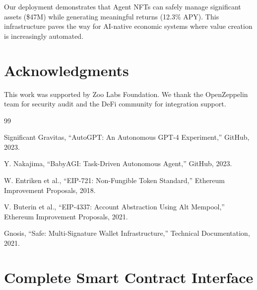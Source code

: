 \documentclass[11pt,letterpaper]{article}
\begin{document}
Our deployment demonstrates that Agent NFTs can safely manage significant assets (\$47M) while generating meaningful returns (12.3\% APY). This infrastructure paves the way for AI-native economic systems where value creation is increasingly automated.

\section*{Acknowledgments}

This work was supported by Zoo Labs Foundation. We thank the OpenZeppelin team for security audit and the DeFi community for integration support.


\begin{thebibliography}{99}

Significant Gravitas, ``AutoGPT: An Autonomous GPT-4 Experiment,'' GitHub, 2023.

Y. Nakajima, ``BabyAGI: Task-Driven Autonomous Agent,'' GitHub, 2023.

W. Entriken et al., ``EIP-721: Non-Fungible Token Standard,'' Ethereum Improvement Proposals, 2018.

V. Buterin et al., ``EIP-4337: Account Abstraction Using Alt Mempool,'' Ethereum Improvement Proposals, 2021.

Gnosis, ``Safe: Multi-Signature Wallet Infrastructure,'' Technical Documentation, 2021.

\end{thebibliography}

\appendix

\section{Complete Smart Contract Interface}
\end{document}
